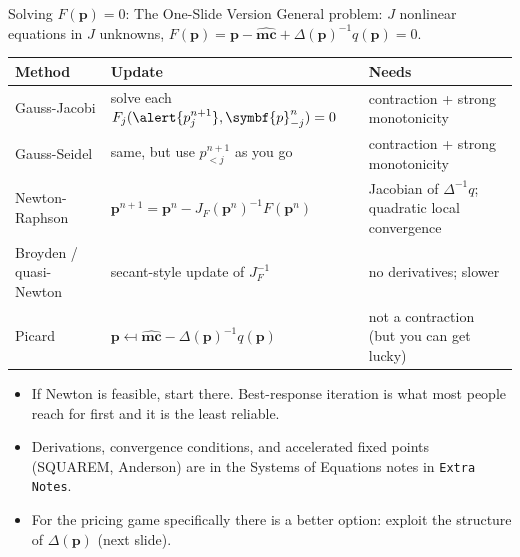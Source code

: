 \documentclass[aspectratio=169,10pt]{beamer}
\begin{document}
\begin{frame}{Solving $F(\symbf{p})=0$: The One-Slide Version}
General problem: $J$ nonlinear equations in $J$ unknowns, $F(\symbf{p}) = \symbf{p} - \widehat{\symbf{mc}} + \Delta(\symbf{p})^{-1}q(\symbf{p})=0$.
\begin{center}
\footnotesize
\begin{tabular}{lll}
\toprule
Method & Update & Needs \\
\midrule
Gauss-Jacobi & solve each $F_j(\alert{p_j^{n+1}}, \symbf{p}_{-j}^{n})=0$ & contraction + strong monotonicity \\
Gauss-Seidel & same, but use $p_{<j}^{n+1}$ as you go & contraction + strong monotonicity \\
Newton-Raphson & $\symbf{p}^{n+1} = \symbf{p}^n - J_F(\symbf{p}^n)^{-1} F(\symbf{p}^n)$ & Jacobian of $\Delta^{-1} q$; quadratic local convergence \\
Broyden / quasi-Newton & secant-style update of $J_F^{-1}$ & no derivatives; slower \\
Picard & $\symbf{p} \mapsfrom \widehat{\symbf{mc}} - \Delta(\symbf{p})^{-1}q(\symbf{p})$ & \alert{not a contraction} (but you can get lucky) \\
\bottomrule
\end{tabular}
\end{center}
\begin{itemize}
\item If Newton is feasible, start there. Best-response iteration is what most people reach for first and it is the least reliable.
\item Derivations, convergence conditions, and accelerated fixed points (SQUAREM, Anderson) are in the \alert{Systems of Equations} notes in \texttt{Extra Notes}.
\item For the pricing game specifically there is a better option: exploit the structure of $\Delta(\symbf{p})$ (next slide).
\end{itemize}
\end{frame}
\end{document}
